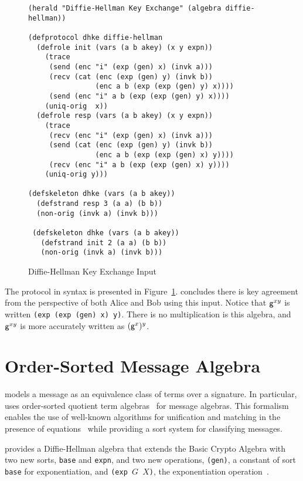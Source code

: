 \documentclass[12pt]{article}
\newcommand{\gen}{\ensuremath{\cn{g}}}
\begin{document}
\begin{figure}
\begingroup\footnotesize
\begin{verbatim}
(herald "Diffie-Hellman Key Exchange" (algebra diffie-hellman))

(defprotocol dhke diffie-hellman
  (defrole init (vars (a b akey) (x y expn))
    (trace
     (send (enc "i" (exp (gen) x) (invk a)))
     (recv (cat (enc (exp (gen) y) (invk b))
                (enc a b (exp (exp (gen) y) x))))
     (send (enc "i" a b (exp (exp (gen) y) x))))
    (uniq-orig  x))
  (defrole resp (vars (a b akey) (x y expn))
    (trace
     (recv (enc "i" (exp (gen) x) (invk a)))
     (send (cat (enc (exp (gen) y) (invk b))
                (enc a b (exp (exp (gen) x) y))))
     (recv (enc "i" a b (exp (exp (gen) x) y))))
    (uniq-orig y)))

(defskeleton dhke (vars (a b akey))
  (defstrand resp 3 (a a) (b b))
  (non-orig (invk a) (invk b)))

 (defskeleton dhke (vars (a b akey))
   (defstrand init 2 (a a) (b b))
   (non-orig (invk a) (invk b)))
\end{verbatim}
\endgroup
\caption{Diffie-Hellman Key Exchange {\cpsa} Input}\label{fig:dhke}
\end{figure}

The protocol in {\cpsa} syntax is presented in Figure~\ref{fig:dhke}.
{\cpsa} concludes there is key agreement from the perspective of both
Alice and Bob using this input.  Notice that $\gen^{xy}$ is written
\texttt{(exp (exp (gen) x) y)}.  There is no multiplication is this
algebra, and $\gen^{xy}$ is more accurately written as $(\gen^x)^y$.

\section{Order-Sorted Message Algebra}\label{sec:order-sorted mesg algs}

{\cpsa} models a message as an equivalence class of terms over a
signature.  In particular, {\cpsa} uses order-sorted quotient term
algebras~\cite{GoguenMeseguer92} for message algebras.  This formalism
enables the use of well-known algorithms for unification and matching
in the presence of equations~\cite[Chapter~8]{RobinsonVoronkov01}
while providing a sort system for classifying messages.

{\cpsa} provides a Diffie-Hellman algebra that extends the Basic
Crypto Algebra with two new sorts, \texttt{base} and \texttt{expn},
and two new operations, \texttt{(gen)}, a constant of sort
\texttt{base} for exponentiation, and \texttt{(exp $G$ $X$)}, the
exponentiation operation~\cite{cpsauser09}.
\end{document}
